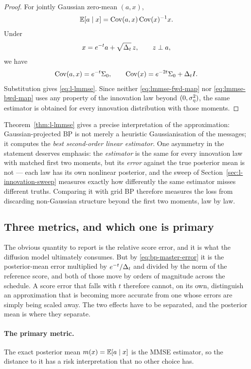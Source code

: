 \begin{proof}
For jointly Gaussian zero-mean $(a,x)$,
\[
  \mathbb{E}[a\mid x]
  =
  \operatorname{Cov}(a,x)\operatorname{Cov}(x)^{-1}x.
\]
Under
\[
  x=e^{-t}a+\sqrt{\Delta_t}\,z,
  \qquad z\perp a,
\]
we have
\begin{equation}
  \operatorname{Cov}(a,x)=e^{-t}\Sigma_0,
  \qquad
  \operatorname{Cov}(x)=e^{-2t}\Sigma_0+\Delta_t I .
  \label{eq:lmmse-covs}
\end{equation}
Substitution gives \eqref{eq:l-lmmse}. Since neither
\eqref{eq:lmmse-fwd-map} nor \eqref{eq:lmmse-bwd-map} uses any property of
the innovation law beyond $(0,\sigma_\eta^2)$, the same estimator is obtained for
every innovation distribution with those moments.
\end{proof}

Theorem~\ref{thm:l-lmmse} gives a precise interpretation of the approximation:
Gaussian-projected BP is not merely a heuristic Gaussianisation of the
messages; it computes the \emph{best second-order linear estimator}. One
asymmetry in the statement deserves emphasis: the \emph{estimator} is the
same for every innovation law with matched first two moments, but its
\emph{error} against the true posterior mean is not --- each law has its own
nonlinear posterior, and the sweep of Section~\ref{sec:l-innovation-sweep}
measures exactly how differently the same estimator misses different truths.
Comparing it with grid BP therefore measures the loss from discarding
non-Gaussian structure beyond the first two moments, law by law.

\subsection{Three metrics, and which one is primary}
\label{sec:l-metrics}

The obvious quantity to report is the relative score error, and it is what the
diffusion model ultimately consumes. But by \eqref{eq:bp-master-error} it is
the posterior-mean error multiplied by $e^{-t}/\Delta_t$ and divided by the norm
of the reference score, and both of those move by orders of magnitude across
the schedule. A score error that falls with $t$ therefore cannot, on its own,
distinguish an approximation that is becoming more accurate from one whose
errors are simply being scaled away. The two effects have to be separated, and
the posterior mean is where they separate.

\paragraph{The primary metric.} The exact posterior mean $m(x) = \mathbb{E}[a \mid x]$
is the MMSE estimator, so the distance to it has a risk interpretation that no
other choice has.

